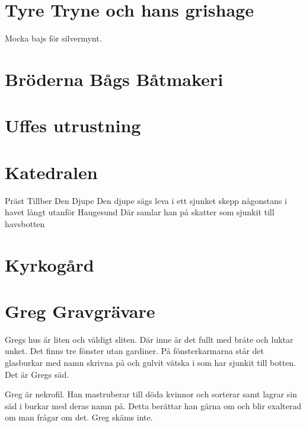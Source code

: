 \section*{Tyre Tryne och hans grishage}
Mocka bajs för silvermynt.
%
\section*{Bröderna Bågs Båtmakeri}
%
\section*{Uffes utrustning}
%
\section*{Katedralen}
Präst
Tillber Den Djupe
Den djupe sägs leva i ett sjunket skepp någonstans i havet långt utanför Haugesund
Där samlar han på skatter som sjunkit till havsbotten
%
\section*{Kyrkogård}
% 
\section*{Greg Gravgrävare}
Gregs hus är liten och väldigt sliten. Där inne är det fullt med bråte och luktar unket. Det finns tre fönster utan gardiner. På fönsterkarmarna står det glasburkar med namn skrivna på och gulvit vätska i som har sjunkit till botten. Det är Gregs säd.

Greg är nekrofil. Han mastruberar till döda kvinnor och sorterar samt lagrar sin säd i burkar med deras namn på. Detta berättar han gärna om och blir exalterad om man frågar om det. Greg skäms inte.


